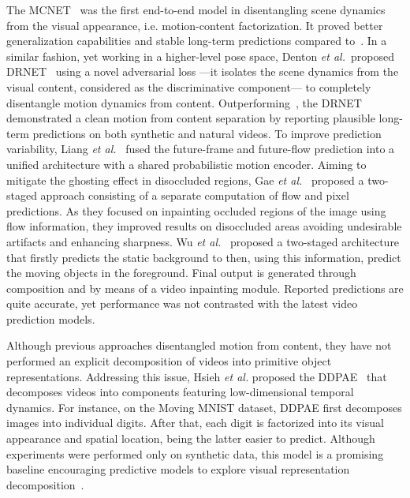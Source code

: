 The \ac{MCNET}~\cite{Villegas2017a} was the first end-to-end model in disentangling scene dynamics from the visual appearance, i.e. motion-content factorization. It proved better generalization capabilities and stable long-term predictions compared to~\cite{Srivastava2015,Mathieu2016}. In a similar fashion, yet working in a higher-level pose space, Denton \textit{et al.}~proposed \ac{DRNET}~\cite{Denton2017} using a novel adversarial loss ---it isolates the scene dynamics from the visual content, considered as the discriminative component--- to completely disentangle motion dynamics from content. Outperforming~\cite{Mathieu2016,Villegas2017a}, the \ac{DRNET} demonstrated a clean motion from content separation by reporting plausible long-term predictions on both synthetic and natural videos. To improve prediction variability, Liang \textit{et al.}~\cite{Liang2017} fused the future-frame and future-flow prediction into a unified architecture with a shared probabilistic motion encoder. Aiming to mitigate the ghosting effect in disoccluded regions, Gae \textit{et al.}~\cite{Gao2019} proposed a two-staged approach consisting of a separate computation of flow and pixel predictions. As they focused on inpainting occluded regions of the image using flow information, they improved results on disoccluded areas avoiding undesirable artifacts and enhancing sharpness. Wu \textit{et al.}~\cite{Wu2020} proposed a two-staged architecture that firstly predicts the static background to then, using this information, predict the moving objects in the foreground. Final output is generated through composition and by means of a video inpainting module. Reported predictions are quite accurate, yet performance was not contrasted with the latest video prediction models.

Although previous approaches disentangled motion from content, they have not performed an explicit decomposition of videos into primitive object representations. Addressing this issue, Hsieh \textit{et al.} proposed the \ac{DDPAE}~\cite{Hsieh2018} that decomposes videos into components featuring low-dimensional temporal dynamics. For instance, on the Moving MNIST dataset, \ac{DDPAE} first decomposes images into individual digits. After that, each digit is factorized into its visual appearance and spatial location, being the latter easier to predict. Although experiments were performed only on synthetic data, this model is a promising baseline encouraging predictive models to explore visual representation decomposition~\cite{Greff2017,Steenkiste2018,Steenkiste2019}.

